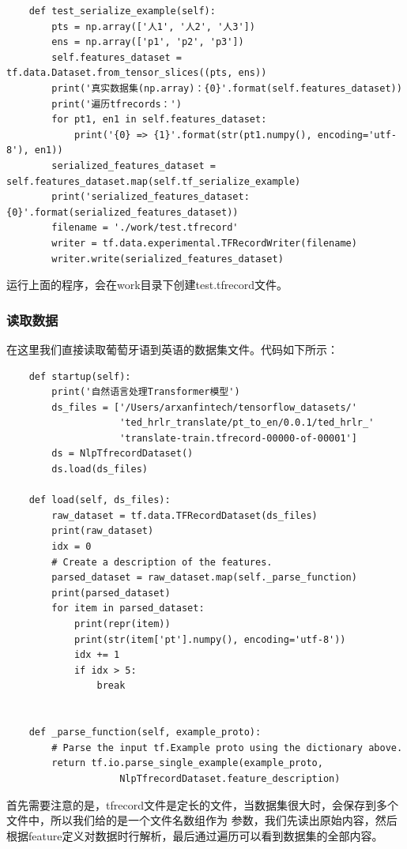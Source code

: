 \documentclass{article}
\begin{document}
\begin{lstlisting}
    def test_serialize_example(self):
        pts = np.array(['人1', '人2', '人3'])
        ens = np.array(['p1', 'p2', 'p3'])
        self.features_dataset = tf.data.Dataset.from_tensor_slices((pts, ens))
        print('真实数据集(np.array)：{0}'.format(self.features_dataset))
        print('遍历tfrecords：')
        for pt1, en1 in self.features_dataset:
            print('{0} => {1}'.format(str(pt1.numpy(), encoding='utf-8'), en1))    
        serialized_features_dataset = self.features_dataset.map(self.tf_serialize_example)
        print('serialized_features_dataset:{0}'.format(serialized_features_dataset))
        filename = './work/test.tfrecord'
        writer = tf.data.experimental.TFRecordWriter(filename)
        writer.write(serialized_features_dataset)    
\end{lstlisting}
运行上面的程序，会在work目录下创建test.tfrecord文件。
\subsubsection{读取数据}
在这里我们直接读取葡萄牙语到英语的数据集文件。代码如下所示：
\begin{lstlisting}
    def startup(self):
        print('自然语言处理Transformer模型')
        ds_files = ['/Users/arxanfintech/tensorflow_datasets/'
                    'ted_hrlr_translate/pt_to_en/0.0.1/ted_hrlr_'
                    'translate-train.tfrecord-00000-of-00001']
        ds = NlpTfrecordDataset()
        ds.load(ds_files)

    def load(self, ds_files):
        raw_dataset = tf.data.TFRecordDataset(ds_files)
        print(raw_dataset)
        idx = 0
        # Create a description of the features.
        parsed_dataset = raw_dataset.map(self._parse_function)
        print(parsed_dataset)
        for item in parsed_dataset:
            print(repr(item))
            print(str(item['pt'].numpy(), encoding='utf-8'))
            idx += 1
            if idx > 5:
                break      

    
    def _parse_function(self, example_proto):
        # Parse the input tf.Example proto using the dictionary above.
        return tf.io.parse_single_example(example_proto, 
                    NlpTfrecordDataset.feature_description) 
\end{lstlisting}
首先需要注意的是，tfrecord文件是定长的文件，当数据集很大时，会保存到多个文件中，所以我们给的是一个文件名数组作为
参数，我们先读出原始内容，然后根据feature定义对数据时行解析，最后通过遍历可以看到数据集的全部内容。
\end{document}
